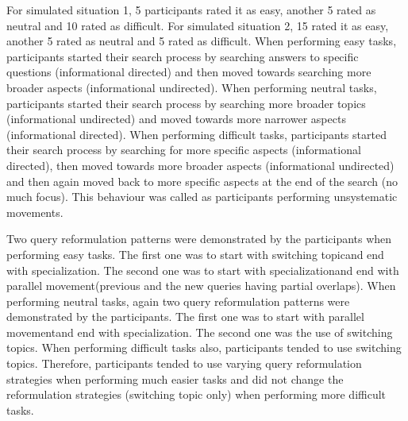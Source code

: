 \documentclass[]{article}
\begin{document}
\begin{enumerate}
For simulated situation 1, 5 participants rated it as easy, another 5 rated as neutral and 10 rated as difficult. For simulated situation 2, 15 rated it as easy, another 5 rated as neutral and 5 rated as difficult. When performing easy tasks, participants started their search process by searching answers to specific questions (informational directed) and then moved towards searching more broader aspects (informational undirected). When performing neutral tasks, participants started their search process by searching more broader topics (informational undirected) and moved towards more narrower aspects (informational directed). When performing difficult tasks, participants started their search process by searching for more specific aspects (informational directed), then moved towards more broader aspects (informational undirected) and then again moved back to more specific aspects at the end of the search (no much focus). This behaviour was called as participants performing \textquotesingle unsystematic movements\textquotesingle. 

Two query reformulation patterns were demonstrated by the participants when performing easy tasks. The first one was to start with \textquotesingle switching topic\textquotesingle and end with \textquotesingle specialization\textquotesingle. The second one was to start with \textquotesingle specialization\textquotesingle and end with \textquotesingle parallel movement\textquotesingle (previous and the new queries having partial overlaps). When performing neutral tasks, again two query reformulation patterns were demonstrated by the participants. The first one was to start with \textquotesingle parallel movement\textquotesingle and end with \textquotesingle specialization\textquotesingle. The second one was the use of \textquotesingle switching topics\textquotesingle. When performing difficult tasks also, participants tended to use \textquotesingle switching topics\textquotesingle. Therefore, participants tended to use varying query reformulation strategies when performing much easier tasks and did not change the reformulation strategies (switching topic only) when performing more difficult tasks.


\end{enumerate}
\end{document}
